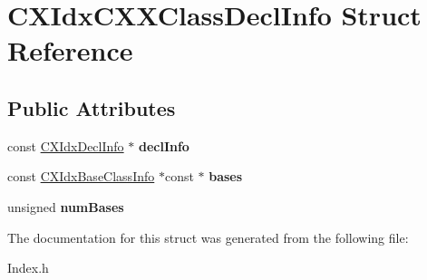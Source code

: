 \hypertarget{structCXIdxCXXClassDeclInfo}{}\section{C\+X\+Idx\+C\+X\+X\+Class\+Decl\+Info Struct Reference}
\label{structCXIdxCXXClassDeclInfo}
\subsection*{Public Attributes}
\begin{DoxyCompactItemize}
\item 
\mbox{\label{structCXIdxCXXClassDeclInfo_a49187f6aa7bcf00343662721d806d553}} 
const \mbox{\hyperlink{structCXIdxDeclInfo}{C\+X\+Idx\+Decl\+Info}} $\ast$ {\bfseries decl\+Info}
\item 
\mbox{\label{structCXIdxCXXClassDeclInfo_ab143f312c0fe82e44ad9fb58ffe66f35}} 
const \mbox{\hyperlink{structCXIdxBaseClassInfo}{C\+X\+Idx\+Base\+Class\+Info}} $\ast$const  $\ast$ {\bfseries bases}
\item 
\mbox{\label{structCXIdxCXXClassDeclInfo_ac8b3da9564378790fc398dc02b33e301}} 
unsigned {\bfseries num\+Bases}
\end{DoxyCompactItemize}


The documentation for this struct was generated from the following file\+:\begin{DoxyCompactItemize}
\item 
Index.\+h\end{DoxyCompactItemize}

